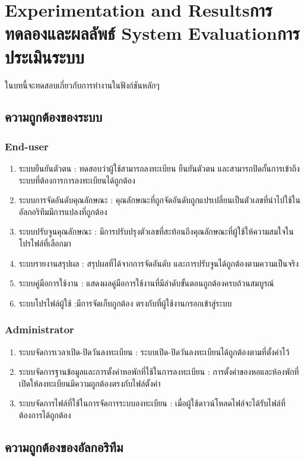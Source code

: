 \chapter{\ifproject%
\ifenglish Experimentation and Results\else การทดลองและผลลัพธ์\fi
\else%
\ifenglish System Evaluation\else การประเมินระบบ\fi
\fi}

ในบทนี้จะทดสอบเกี่ยวกับการทำงานในฟังก์ชันหลักๆ

\section{ความถูกต้องของระบบ}
\subsection{End-user}
\begin{enumerate}
    \item ระบบยืนยันตัวตน : ทดสอบว่าผู้ใช้สามารถลงทะเบียน ยืนยันตัวตน และสามารถปิดกั้นการเข้าถึงระบบที่ต้องการการลงทะเบียนได้ถูกต้อง
    \item ระบบการจัดอันดับคุณลักษณะ : คุณลักษณะที่ถูกจัดอันดับถูกแปรเปลี่ยนเป็นตัวเลขที่นำไปใช้ในอัลกอริทึมมีการแปลงที่ถูกต้อง
    \item ระบบปรับจูนคุณลักษณะ : มีการปรับปรุงตัวเลขที่สะท้อนถึงคุณลักษณะที่ผู้ใช้ให้ความสมใจในโปรไฟล์ที่เลือกมา
    \item ระบบรายงานสรุปผล : สรุปผลที่ได้จากการจัดอันดับ และการปรับจูนได้ถูกต้องตามความเป็นจริง
    \item ระบบคู่มือการใช้งาน : แสดงผลคู่มือการใช้งานที่มีลำดับขั้นตอนถูกต้องครบถ้วนสมบูรณ์
    \item ระบบโปรไฟล์ผู้ใช้ :มีการจัดเก็บถูกต้อง ตรงกับที่ผู้ใช้งานกรอกเข้าสู่ระบบ
\end{enumerate}
\subsection{Administrator}
\begin{enumerate}
    \item ระบบจัดการเวลาเปิด-ปิดวันลงทะเบียน : ระบบเปิด-ปิดวันลงทะเบียนได้ถูกต้องตามที่ตั้งค่าไว้
    \item ระบบจัดการฐานข้อมูลและการตั้งค่าหอพักที่ใช้ในการลงทะเบียน : การตั้งค่าของหอและห้องพักที่เปิดให้ลงทะเบียนมีความถูกต้องตรงกับไฟล์ตั้งค่า
    \item ระบบจัดการไฟล์ที่ใช้ในการจัดการระบบลงทะเบียน : เมื่อผู้ใช้ดาวน์โหลดไฟล์จะได้รับไฟล์ที่ต้องการได้ถูกต้อง
\end{enumerate}
\section{ความถูกต้องของอัลกอริทึม}
